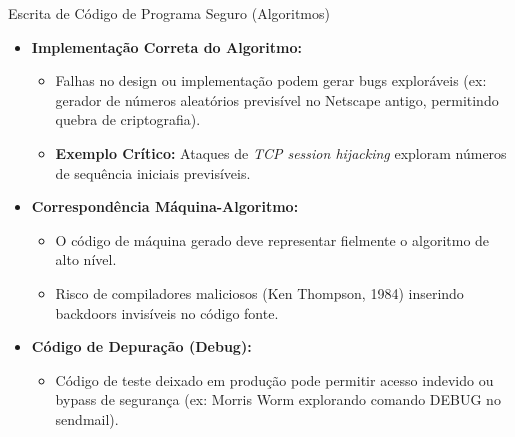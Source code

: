 \begin{frame}{Escrita de Código de Programa Seguro (Algoritmos)}
    \begin{itemize}
        \item \textbf{Implementação Correta do Algoritmo:}
              \begin{itemize}
                  \item Falhas no design ou implementação podem gerar bugs exploráveis (ex: gerador de números aleatórios previsível no Netscape antigo, permitindo quebra de criptografia).
                  \item \textbf{Exemplo Crítico:} Ataques de \textit{TCP session hijacking} exploram números de sequência iniciais previsíveis.
              \end{itemize}

        \item \textbf{Correspondência Máquina-Algoritmo:}
              \begin{itemize}
                  \item O código de máquina gerado deve representar fielmente o algoritmo de alto nível.
                  \item Risco de compiladores maliciosos (Ken Thompson, 1984) inserindo backdoors invisíveis no código fonte.
              \end{itemize}

        \item \textbf{Código de Depuração (Debug):}
              \begin{itemize}
                  \item Código de teste deixado em produção pode permitir acesso indevido ou bypass de segurança (ex: Morris Worm explorando comando DEBUG no sendmail).
              \end{itemize}
    \end{itemize}
\end{frame}

